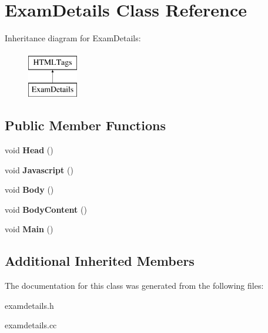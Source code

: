 \hypertarget{classExamDetails}{\section{Exam\-Details Class Reference}
\label{classExamDetails}
}
Inheritance diagram for Exam\-Details\-:\begin{figure}[H]
\begin{center}
\leavevmode
\includegraphics[height=2.000000cm]{classExamDetails}
\end{center}
\end{figure}
\subsection*{Public Member Functions}
\begin{DoxyCompactItemize}
\item 
\hypertarget{classExamDetails_a356f72609abf6d93a6b173af5f28f4db}{void {\bfseries Head} ()}\label{classExamDetails_a356f72609abf6d93a6b173af5f28f4db}

\item 
\hypertarget{classExamDetails_a4925302cb9555f1cadec37872367b0a2}{void {\bfseries Javascript} ()}\label{classExamDetails_a4925302cb9555f1cadec37872367b0a2}

\item 
\hypertarget{classExamDetails_ae8a4c439804372417bcd37976a185626}{void {\bfseries Body} ()}\label{classExamDetails_ae8a4c439804372417bcd37976a185626}

\item 
\hypertarget{classExamDetails_a357e0a4b9116a69af06bd312c809f84e}{void {\bfseries Body\-Content} ()}\label{classExamDetails_a357e0a4b9116a69af06bd312c809f84e}

\item 
\hypertarget{classExamDetails_a9ae3ecade5e455f7b71f4ef46febe71b}{void {\bfseries Main} ()}\label{classExamDetails_a9ae3ecade5e455f7b71f4ef46febe71b}

\end{DoxyCompactItemize}
\subsection*{Additional Inherited Members}


The documentation for this class was generated from the following files\-:\begin{DoxyCompactItemize}
\item 
examdetails.\-h\item 
examdetails.\-cc\end{DoxyCompactItemize}
